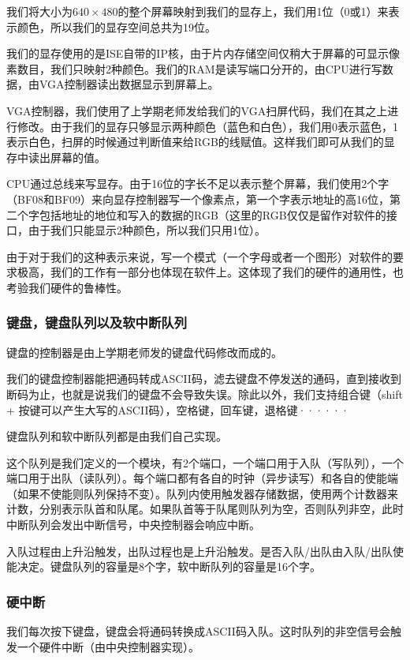 我们将大小为$640 \times 480$的整个屏幕映射到我们的显存上，我们用1位（0或1）来表示颜色，所以我们的显存空间总共为19位。 

我们的显存使用的是ISE自带的IP核，由于片内存储空间仅稍大于屏幕的可显示像素数目，我们只映射2种颜色。我们的RAM是读写端口分开的，由CPU进行写数据，由VGA控制器读出数据显示到屏幕上。

VGA控制器，我们使用了上学期老师发给我们的VGA扫屏代码，我们在其之上进行修改。由于我们的显存只够显示两种颜色（蓝色和白色），我们用0表示蓝色，1表示白色，扫屏的时候通过判断值来给RGB的线赋值。这样我们即可从我们的显存中读出屏幕的值。

CPU通过总线来写显存。由于16位的字长不足以表示整个屏幕，我们使用2个字（BF08和BF09）来向显存控制器写一个像素点，第一个字表示地址的高16位，第二个字包括地址的地位和写入的数据的RGB（这里的RGB仅仅是留作对软件的接口，由于我们只能显示2种颜色，所以我们只用1位）。

由于对于我们的这种表示来说，写一个模式（一个字母或者一个图形）对软件的要求极高，我们的工作有一部分也体现在软件上。这体现了我们的硬件的通用性，也考验我们硬件的鲁棒性。


\subsubsection{键盘，键盘队列以及软中断队列}

键盘的控制器是由上学期老师发的键盘代码修改而成的。

我们的键盘控制器能把通码转成ASCII码，滤去键盘不停发送的通码，直到接收到断码为止，也就是说我们的键盘不会导致失误。除此以外，我们支持组合键（shift + 按键可以产生大写的ASCII码），空格键，回车键，退格键······

键盘队列和软中断队列都是由我们自己实现。

这个队列是我们定义的一个模块，有2个端口，一个端口用于入队（写队列），一个端口用于出队（读队列）。每个端口都有各自的时钟（异步读写）和各自的使能端（如果不使能则队列保持不变）。队列内使用触发器存储数据，使用两个计数器来计数，分别表示队首和队尾。如果队首等于队尾则队列为空，否则队列非空，此时中断队列会发出中断信号，中央控制器会响应中断。

入队过程由上升沿触发，出队过程也是上升沿触发。是否入队/出队由入队/出队使能决定。键盘队列的容量是8个字，软中断队列的容量是16个字。

\subsubsection{硬中断}
我们每次按下键盘，键盘会将通码转换成ASCII码入队。这时队列的非空信号会触发一个硬件中断（由中央控制器实现）。

